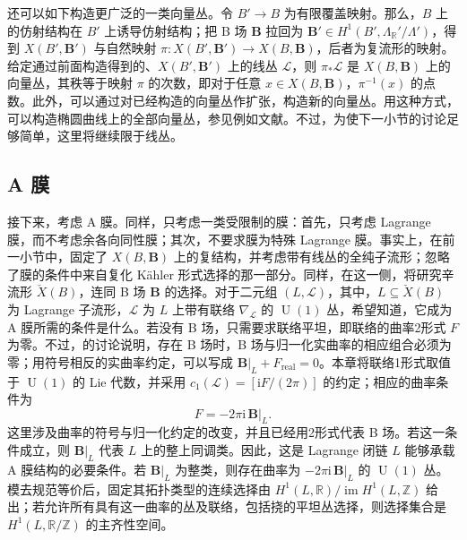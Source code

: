 还可以如下构造更广泛的一类向量丛。令 $B'\to B$ 为有限覆盖映射。那么，$B$ 上的仿射结构在 $B'$ 上诱导仿射结构；把 B 场 $\mathbf B$ 拉回为 $\mathbf B'\in H^1(B',\Lambda_{\mathbb R}'/\Lambda')$，得到 $X(B',\mathbf B')$ 与自然映射 $\pi\colon X(B',\mathbf B')\to X(B,\mathbf B)$，后者为复流形的映射。给定通过前面构造得到的、$X(B',\mathbf B')$ 上的线丛 $\mathcal L$，则 $\pi_*\mathcal L$ 是 $X(B,\mathbf B)$ 上的向量丛，其秩等于映射 $\pi$ 的次数，即对于任意 $x\in X(B,\mathbf B)$，$\pi^{-1}(x)$ 的点数。此外，可以通过对已经构造的向量丛作扩张，构造新的向量丛。用这种方式，可以构造椭圆曲线上的全部向量丛，参见例如文献。不过，为使下一小节的讨论足够简单，这里将继续限于线丛。

\subsection{A 膜}\label{sec:6.3.2}

接下来，考虑 A 膜。同样，只考虑一类受限制的膜：首先，只考虑 Lagrange 膜，而不考虑余各向同性膜；其次，不要求膜为特殊 Lagrange 膜。事实上，在前一小节中，固定了 $X(B,\mathbf B)$ 上的复结构，并考虑带有线丛的全纯子流形；忽略了膜的条件中来自复化 Kähler 形式选择的那一部分。同样，在这一侧，将研究辛流形 $\check X(B)$，连同 B 场 $\mathbf B$ 的选择。对于二元组 $(L,\mathcal L)$，其中，$L\subseteq\check X(B)$ 为 Lagrange 子流形，$\mathcal L$ 为 $L$ 上带有联络 $\nabla_{\mathcal L}$ 的 $\operatorname{U}(1)$ 丛，希望知道，它成为 A 膜所需的条件是什么。若没有 B 场，只需要求联络平坦，即联络的曲率2形式 $F$ 为零。不过，的讨论说明，存在 B 场时，B 场与归一化实曲率的相应组合必须为零；用符号相反的实曲率约定，可以写成 $\mathbf B|_L+F_{\mathrm{real}}=0$。本章将联络1形式取值于 $\operatorname{U}(1)$ 的 Lie 代数，并采用 $c_1(\mathcal L)=[\mathrm iF/(2\pi)]$ 的约定；相应的曲率条件为
\[
F=-2\pi\mathrm i\,\mathbf B|_L.
\]
这里涉及曲率的符号与归一化约定的改变，并且已经用2形式代表 B 场。若这一条件成立，则 $\mathbf B|_L$ 代表 $L$ 上的整上同调类。因此，这是 Lagrange 闭链 $L$ 能够承载 A 膜结构的必要条件。若 $\mathbf B|_L$ 为整类，则存在曲率为 $-2\pi\mathrm i\,\mathbf B|_L$ 的 $\operatorname{U}(1)$ 丛。模去规范等价后，固定其拓扑类型的连续选择由 $H^1(L,\mathbb R)/\operatorname{im}H^1(L,\mathbb Z)$ 给出；若允许所有具有这一曲率的丛及联络，包括挠的平坦丛选择，则选择集合是 $H^1(L,\mathbb R/\mathbb Z)$ 的主齐性空间。


